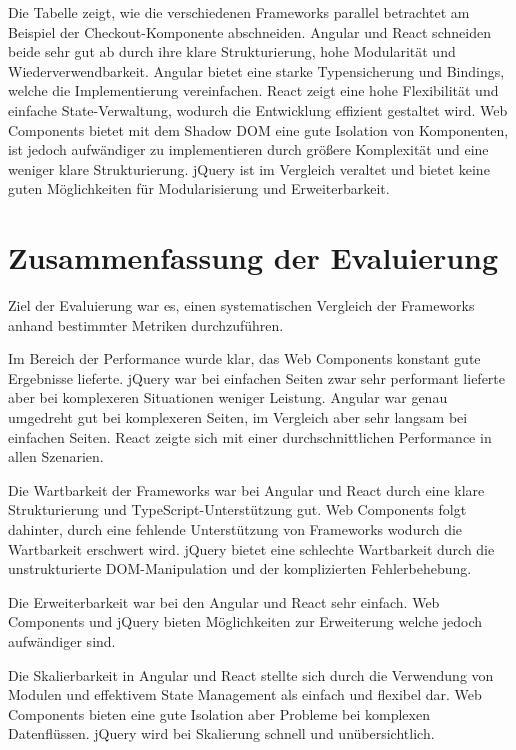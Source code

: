 \documentclass[oneside]{ausarbeitung}
\begin{document}
Die Tabelle zeigt, wie die verschiedenen Frameworks parallel betrachtet am Beispiel der Checkout-Komponente abschneiden. Angular und React schneiden beide sehr gut ab durch ihre klare Strukturierung, hohe Modularität und Wiederverwendbarkeit. Angular bietet eine starke Typensicherung und Bindings, welche die Implementierung vereinfachen. React zeigt eine hohe Flexibilität und einfache State-Verwaltung, wodurch die Entwicklung effizient gestaltet wird. Web Components bietet mit dem Shadow DOM eine gute Isolation von Komponenten, ist jedoch aufwändiger zu implementieren durch größere Komplexität und eine weniger klare Strukturierung. jQuery ist im Vergleich veraltet und bietet keine guten Möglichkeiten für Modularisierung und Erweiterbarkeit.

\section{Zusammenfassung der Evaluierung}
\label{sec:Zusammenfassung_der_Evaluierung}

Ziel der Evaluierung war es, einen systematischen Vergleich der Frameworks anhand bestimmter Metriken durchzuführen. 

Im Bereich der Performance wurde klar, das Web Components konstant gute Ergebnisse lieferte. jQuery war bei einfachen Seiten zwar sehr performant lieferte aber bei komplexeren Situationen weniger Leistung. Angular war genau umgedreht gut bei komplexeren Seiten, im Vergleich aber sehr langsam bei einfachen Seiten. React zeigte sich mit einer durchschnittlichen Performance in allen Szenarien.

Die Wartbarkeit der Frameworks war bei Angular und React durch eine klare Strukturierung und TypeScript-Unterstützung gut. Web Components folgt dahinter, durch eine fehlende Unterstützung von Frameworks wodurch die  Wartbarkeit erschwert wird. jQuery bietet eine schlechte Wartbarkeit durch die unstrukturierte DOM-Manipulation und der komplizierten Fehlerbehebung. 

Die Erweiterbarkeit war bei den Angular und React sehr einfach. Web Components und jQuery bieten Möglichkeiten zur Erweiterung welche jedoch aufwändiger sind.

Die Skalierbarkeit in Angular und React stellte sich durch die Verwendung von Modulen und effektivem State Management als einfach und flexibel dar. Web Components bieten eine gute Isolation aber Probleme bei komplexen Datenflüssen. jQuery wird bei Skalierung schnell und unübersichtlich.
\end{document}
